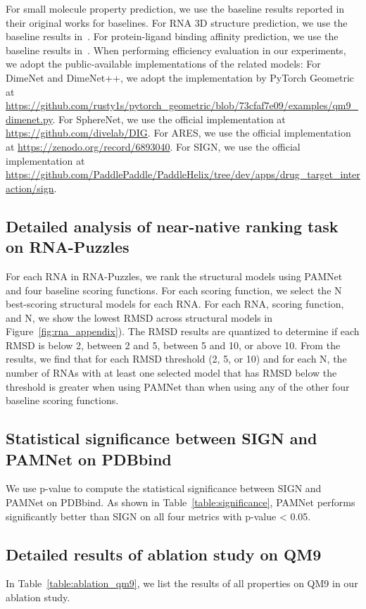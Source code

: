 \documentclass[fleqn,10pt]{wlscirep}
\newcommand{\method}{PAMNet\xspace}
\begin{document}
For small molecule property prediction, we use the baseline results reported in their original works for baselines. For RNA 3D structure prediction, we use the baseline results in~\cite{townshend2021geometric}. For protein-ligand binding affinity prediction, we use the baseline results in~\cite{li2021structure}. When performing efficiency evaluation in our experiments, we adopt the public-available implementations of the related models: For DimeNet and DimeNet++, we adopt the implementation by PyTorch Geometric~\cite{FeyLenssen2019} at \url{https://github.com/rusty1s/pytorch_geometric/blob/73cfaf7e09/examples/qm9_dimenet.py}. For SphereNet, we use the official implementation at \url{https://github.com/divelab/DIG}. For ARES, we use the official implementation at \url{https://zenodo.org/record/6893040}. For SIGN, we use the official implementation at \url{https://github.com/PaddlePaddle/PaddleHelix/tree/dev/apps/drug_target_interaction/sign}. 


\subsection*{Detailed analysis of near-native ranking task on RNA-Puzzles}  \label{rna_appendix}

For each RNA in RNA-Puzzles, we rank the structural models using \method and four baseline scoring functions. For each scoring function, we select the N  best-scoring structural models for each RNA. For each RNA, scoring function, and N, we show the lowest RMSD across structural models in Figure~\ref{fig:rna_appendix}). The RMSD results are quantized to determine if each RMSD is below 2, between 2 and 5, between 5 and 10, or above 10. From the results, we find that for each RMSD threshold (2, 5, or 10) and for each N, the number of RNAs with at least one selected model that has RMSD below the threshold is greater when using \method than when using any of the other four baseline scoring functions.


\subsection*{Statistical significance between SIGN and \method on PDBbind}
We use p-value to compute the statistical significance between SIGN and \method on PDBbind. As shown in Table~\ref{table:significance}, \method performs significantly better than SIGN on all four metrics with p-value < 0.05.


\subsection*{Detailed results of ablation study on QM9}
In Table~\ref{table:ablation_qm9}, we list the results of all properties on QM9 in our ablation study.
\end{document}
